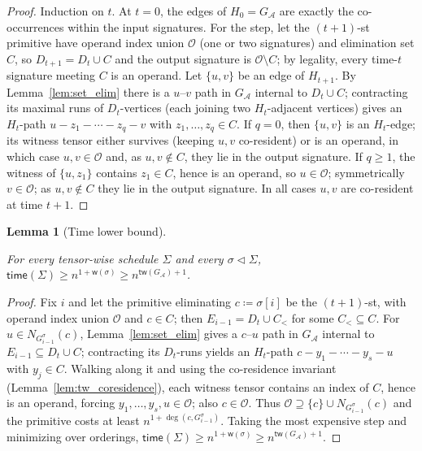 \documentclass[sn-mathphys, natbib=false]{sn-jnl}
\theoremstyle{plain}
\newtheorem{lemma}{Lemma}
\theoremstyle{definition}
\newcommand{\degp}[2]{\deg(#1,#2)}
\newcommand{\neighborvg}[2]{N_{#2}(#1)}
\newcommand{\treewidthp}[1]{\mathsf{tw}(#1)}
\newif\ifshowchanges
\newcommand{\rev}[1]{%
  \ifshowchanges
    {\color{red} #1}%
  \else
    #1%
  \fi
}
\def\calA{\mathcal{A}}
\begin{document}
\begin{bibunit}[agsm]
\begin{proof}
\rev{Induction on $t$. At $t = 0$, the edges of $H_0 = G_\calA$ are exactly the co-occurrences within the input signatures. For the step, let the $(t{+}1)$-st primitive have operand index union $\mathcal{O}$ (one or two signatures) and elimination set $C$, so $D_{t+1} = D_t \cup C$ and the output signature is $\mathcal{O} \setminus C$; by legality, every time-$t$ signature meeting $C$ is an operand. Let $\{u, v\}$ be an edge of $H_{t+1}$. By Lemma~\ref{lem:set_elim} there is a $u$--$v$ path in $G_\calA$ internal to $D_t \cup C$; contracting its maximal runs of $D_t$-vertices (each joining two $H_t$-adjacent vertices) gives an $H_t$-path $u - z_1 - \cdots - z_q - v$ with $z_1, \dots, z_q \in C$. If $q = 0$, then $\{u, v\}$ is an $H_t$-edge; its witness tensor either survives (keeping $u, v$ co-resident) or is an operand, in which case $u, v \in \mathcal{O}$ and, as $u, v \notin C$, they lie in the output signature. If $q \ge 1$, the witness of $\{u, z_1\}$ contains $z_1 \in C$, hence is an operand, so $u \in \mathcal{O}$; symmetrically $v \in \mathcal{O}$; as $u, v \notin C$ they lie in the output signature. In all cases $u, v$ are co-resident at time $t + 1$.}
\end{proof}

\begin{lemma}[Time lower bound]
\label{lem:tw_lower}
\rev{For every tensor-wise schedule $\Sigma$ and every $\sigma \vartriangleleft \Sigma$, $\mathsf{time}(\Sigma) \ge n^{1 + \mathsf{w}(\sigma)} \ge n^{\treewidthp{G_\calA}+1}$.}
\end{lemma}

\begin{proof}
\rev{Fix $i$ and let the primitive eliminating $c \coloneqq \sigma[i]$ be the $(t{+}1)$-st, with operand index union $\mathcal{O}$ and $c \in C$; then $E_{i-1} = D_t \cup C_{<}$ for some $C_{<} \subseteq C$. For $u \in \neighborvg{c}{G^\sigma_{i-1}}$, Lemma~\ref{lem:set_elim} gives a $c$--$u$ path in $G_\calA$ internal to $E_{i-1} \subseteq D_t \cup C$; contracting its $D_t$-runs yields an $H_t$-path $c - y_1 - \cdots - y_s - u$ with $y_j \in C$. Walking along it and using the co-residence invariant (Lemma~\ref{lem:tw_coresidence}), each witness tensor contains an index of $C$, hence is an operand, forcing $y_1, \dots, y_s, u \in \mathcal{O}$; also $c \in \mathcal{O}$. Thus $\mathcal{O} \supseteq \{c\} \cup \neighborvg{c}{G^\sigma_{i-1}}$ and the primitive costs at least $n^{1 + \degp{c}{G^\sigma_{i-1}}}$. Taking the most expensive step and minimizing over orderings, $\mathsf{time}(\Sigma) \ge n^{1 + \mathsf{w}(\sigma)} \ge n^{\treewidthp{G_\calA}+1}$.}
\end{proof}


\end{bibunit}
\end{document}

